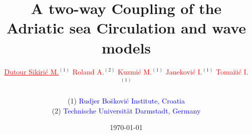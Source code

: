 \documentclass{beamer}
\begin{document}
\title{A two-way Coupling of the Adriatic sea Circulation and wave models}
\author{
\begin{center}
\textcolor{red}{\large \underline{Dutour Sikiri\'c M.}}$^{(1)}$
\textcolor{red}{\large Roland A.}$^{(2)}$
\textcolor{red}{\large Kuzmi\'c M.}$^{(1)}$
\textcolor{red}{\large Janekovi\'c I.}$^{(1)}$
\textcolor{red}{\large Toma\u zi\'c I.}$^{(1)}$\\[2mm]
\end{center}
\begin{flushleft}
(1) \textcolor{blue}{Rudjer Bo\u skovi\'c Institute, Croatia}\\[2mm]
(2) \textcolor{blue}{Technische Universit\"at Darmstadt, Germany}
\end{flushleft}
}
\date{\today} 
\frame{\titlepage} 


\end{document}
